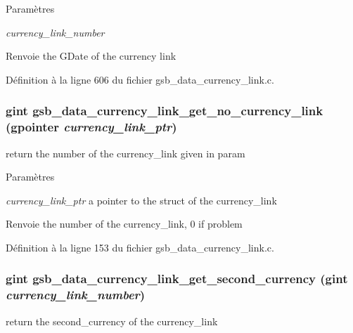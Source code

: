 \begin{DoxyParams}{Paramètres}
\item[{\em currency\_\-link\_\-number}]\end{DoxyParams}
\begin{DoxyReturn}{Renvoie}
the GDate of the currency link 
\end{DoxyReturn}


Définition à la ligne 606 du fichier gsb\_\-data\_\-currency\_\-link.c.

\subsubsection[{gsb\_\-data\_\-currency\_\-link\_\-get\_\-no\_\-currency\_\-link}]{\setlength{\rightskip}{0pt plus 5cm}gint gsb\_\-data\_\-currency\_\-link\_\-get\_\-no\_\-currency\_\-link (gpointer {\em currency\_\-link\_\-ptr})}\label{gsb__data__currency__link_8h_a98649f0d33b433e86464d1446d72736e}
return the number of the currency\_\-link given in param


\begin{DoxyParams}{Paramètres}
\item[{\em currency\_\-link\_\-ptr}]a pointer to the struct of the currency\_\-link\end{DoxyParams}
\begin{DoxyReturn}{Renvoie}
the number of the currency\_\-link, 0 if problem 
\end{DoxyReturn}


Définition à la ligne 153 du fichier gsb\_\-data\_\-currency\_\-link.c.

\subsubsection[{gsb\_\-data\_\-currency\_\-link\_\-get\_\-second\_\-currency}]{\setlength{\rightskip}{0pt plus 5cm}gint gsb\_\-data\_\-currency\_\-link\_\-get\_\-second\_\-currency (gint {\em currency\_\-link\_\-number})}\label{gsb__data__currency__link_8h_a7b5878d793377c0cd6cb5c140f7dc56d}
return the second\_\-currency of the currency\_\-link


